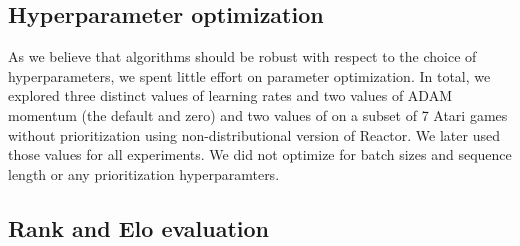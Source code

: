 \documentclass{article}
\begin{document}
\subsection{Hyperparameter optimization}\label{sec:par_opt}
As we believe that algorithms should be robust with respect to the choice of 
hyperparameters, we spent little effort on parameter optimization. In total, we 
explored three distinct values of learning rates and two values of ADAM 
momentum (the default and zero) and two values of  on a subset of 7 
Atari games without prioritization using non-distributional version of Reactor. 
We later used those values for all experiments. We did not optimize for batch 
sizes and sequence length or any prioritization hyperparamters.

\iffalse
Concatenated rectified linear units are used as non-linearities in the network 
\citep{shang2016understanding}. We did this for two reasons. Firstly, as was 
shown by \cite{shang2016understanding}, convolutional neural networks with 
rectified linear units tend to lead to pairs of opposite features. Using 
concatenated rectified linear units allows to reduce the size of the filters by 
half, saving computation. Secondly, neural networks with rectified linear units 
tend to age when a given unit gets pushed below zero by a wild gradient, and 
being clamped at zero there is no gradient to ever pull it back up again. Using 
concatenated ReLUs helps to solve this problem, because if a neuron 
gets pushed below zero, activation pops up again on the negative side. It is up 
to the next linearity to learn not to use a value if it is not necessary.
\fi

\subsection{Rank and Elo evaluation}
\label{rank-and-elo}
\end{document}
